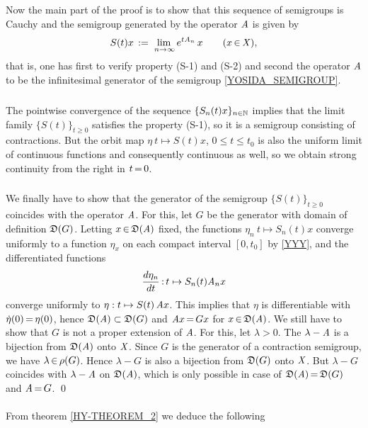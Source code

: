 \documentclass[11pt,twoside]{article}
\begin{document}
\subparagraph{}
Now the main part of the proof is to show that
this sequence of semigroups is Cauchy and the semigroup generated
by the operator $\mathit{A}$ is given by
\begin{equation}\label{YOSIDA_SEMIGROUP}
S(t)x \,:=\, \lim_{\,n \to \infty} e^{t \mathit{A}_n}\,x
\quad \quad (x {\,\in\,} \mathit{X}),
\end{equation}
that is,
one has first to verify property (S-1) and (S-2)
and second the operator $\mathit{A}$ to be
the infinitesimal generator of the semigroup \eqref{YOSIDA_SEMIGROUP}.

\subparagraph{}
The pointwise convergence of the sequence $\{S_n(t)x\}_{n \in {\mathbb{N}}}$ implies
that the limit family $\{S(t)\}_{t \geq 0}$ satisfies the property (S-1),
so it is a semigroup consisting of contractions.
But the orbit map $\eta \: t \mapsto S(t)x$, $0 \leq t \leq t_0$
is also the uniform limit of continuous functions and consequently
continuous as well,
so we obtain strong continuity from the right in $t {\,=\,} 0$.

\subparagraph{}
We finally have to show that
the generator of the semigroup $\{S(t)\}_{t \geq 0}$ coincides
with the operator $\mathit{A}$.
For this, let $G$ be the generator with domain of definition $\mathfrak{D}(G)$.
Letting $x {\,\in\,} \mathfrak{D}(\mathit{A})$ fixed,
the functions $\eta_n \: t \mapsto S_n(t)x$ converge uniformly
to a function $\eta_x$ on each compact interval $[0,t_0]$ by \eqref{YYY},
and the differentiated functions
\[
\frac{d \eta_n}{dt} {\,:\,} t \mapsto S_n(t) \mathit{A}_n x
\]
converge uniformly to $\eta:t \mapsto S(t)\,\mathit{A} x$.
This implies that $\eta$ is differentiable with $\dot{\eta}(0) {\,=\,} \eta(0)$,
hence $\mathfrak{D}(\mathit{A}) \subset \mathfrak{D}(G)$ and $\mathit{A} x {\,=\,} Gx$
for $x {\,\in\,} \mathfrak{D}(\mathit{A})$.
We still have to show that $G$ is not a proper extension of $\mathit{A}$.
For this, let $\lambda > 0$.
The $\lambda -\mathit{A}$ is a bijection from $\mathfrak{D}(\mathit{A})$ onto $\mathit{X}$.
Since $G$ is the generator of a contraction semigroup,
we have $\lambda {\,\in\,} \rho(G)$.
Hence $\lambda - G$ is also a bijection from $\mathfrak{D}(G)$ onto $\mathit{X}$.
But $\lambda-G$ coincides with $\lambda-\mathit{A}$ on $\mathfrak{D}(\mathit{A})$,
which is only possible in case of $\mathfrak{D}(\mathit{A}) {\,=\,} \mathfrak{D}(G)$
and $\mathit{A} {\,=\,} G$.
\qed

\paragraph{}
From theorem \ref{HY-THEOREM_2} we deduce the following
\end{document}
